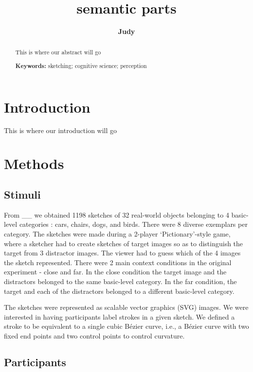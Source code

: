 \documentclass[10pt,letterpaper]{article}
\title{semantic parts}
\author{{\large \bf Judy} \AND {\large \bf Robert}\AND {\large \bf Kushin}
  }
\begin{document}
\maketitle 


\begin{abstract}
This is where our abstract will go

\textbf{Keywords:} 
sketching; cognitive science; perception
\end{abstract}



\section{Introduction}
This is where our introduction will go




\section{Methods}


\subsection{Stimuli}

 From \_\_ we obtained 1198 sketches of 32 real-world objects belonging to 4 basic-level categories : cars, chairs, dogs, and birds. There were 8 diverse exemplars per category.
The sketches were made during a 2-player ‘Pictionary’-style game, where a sketcher had to create sketches of target images so as to distinguish the target from 3 distractor images. The viewer had to guess which of the 4 images the sketch represented.
There were 2 main context conditions in the original experiment - close and far. In the close condition the target image and the distractors belonged to the same basic-level category. In the far condition, the target and each of the distractors belonged to a different basic-level category.

The sketches were represented as scalable vector graphics (SVG) images. We were interested in having participants label strokes in a given sketch. We defined a stroke to be equivalent to a single cubic Bézier curve, i.e., a Bézier curve with two fixed end points and two control points to control curvature.



\subsection{Participants}
\end{document}
